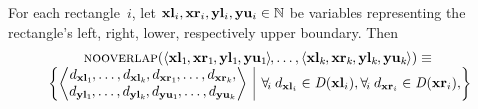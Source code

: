 \begin{definition}
  For each rectangle~$i$, let \mbox{$\mVar{xl}_i, \mVar{xr}_i, \mVar{yl}_i,
    \mVar{yu}_i \in \mNatNumSet$} be \glspl{variable} representing the
  rectangle's left, right, lower, respectively upper boundary.
  Then
  \begin{displaymath}
    \begin{array}{c}
      \mNoOverlap(
        \mTuple{
          \mVar{xl}_1 \hspace{-.8pt},
          \mVar{xr}_1 \hspace{-.8pt},
          \mVar{yl}_1 \hspace{-.8pt},
          \mVar{yu}_1 \hspace{-.8pt}
        } \hspace{-1pt},
        \ldots,
        \mTuple{
          \mVar{xl}_k \hspace{-.8pt},
          \mVar{xr}_k \hspace{-.8pt},
          \mVar{yl}_k \hspace{-.8pt},
          \mVar{yu}_k \hspace{-.8pt}
        }
      )
      \equiv \mbox{} \\
      \mSetBuilder*{%
                     \left\langle
                       \begin{array}{@{}c@{}}
                         d_{\mVar{xl}_1} \hspace{-.8pt}, \ldots, d_{\mVar{xl}_k}
                         \hspace{-.8pt},
                         d_{\mVar{xr}_1} \hspace{-.8pt}, \ldots, d_{\mVar{xr}_k}
                         \hspace{-.8pt}, \\
                         d_{\mVar{yl}_1} \hspace{-.8pt}, \ldots, d_{\mVar{yl}_k}
                         \hspace{-.8pt},
                         d_{\mVar{yu}_1} \hspace{-.8pt}, \ldots, d_{\mVar{yu}_k}
                       \end{array}
                     \right\rangle
                   }%
                   {
                     \begin{array}{@{}l@{}}
                       \forall_{\! i} \: d_{\mVar{xl}_i} \in \mDomain(\mVar{xl}_i),
                       \forall_{\! i} \: d_{\mVar{xr}_i} \in \mDomain(\mVar{xr}_i),
                       \\

\end{array}}
\end{array}
\end{displaymath}
\end{definition}
